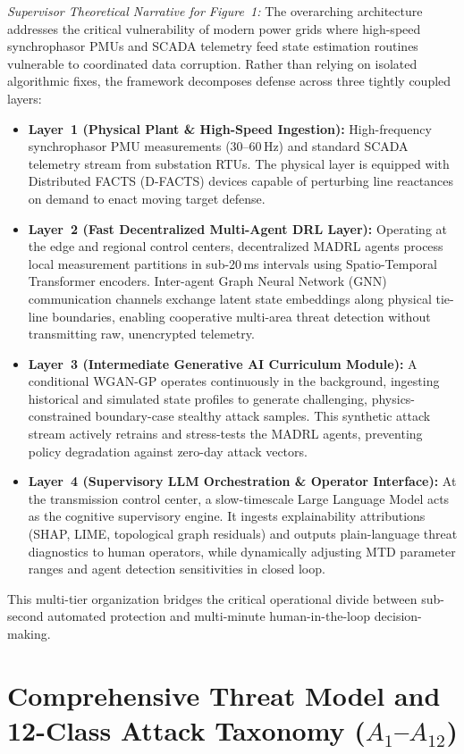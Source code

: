 \documentclass[journal,compsoc]{IEEEtran}
\begin{document}
\textit{Supervisor Theoretical Narrative for Figure~1:}
The overarching architecture addresses the critical vulnerability of modern power grids where high-speed synchrophasor PMUs and SCADA telemetry feed state estimation routines vulnerable to coordinated data corruption. Rather than relying on isolated algorithmic fixes, the framework decomposes defense across three tightly coupled layers:
\begin{itemize}
    \item \textbf{Layer~1 (Physical Plant \& High-Speed Ingestion):} High-frequency synchrophasor PMU measurements (30--60\,Hz) and standard SCADA telemetry stream from substation RTUs. The physical layer is equipped with Distributed FACTS (D-FACTS) devices capable of perturbing line reactances on demand to enact moving target defense.
    \item \textbf{Layer~2 (Fast Decentralized Multi-Agent DRL Layer):} Operating at the edge and regional control centers, decentralized MADRL agents process local measurement partitions in sub-20\,ms intervals using Spatio-Temporal Transformer encoders. Inter-agent Graph Neural Network (GNN) communication channels exchange latent state embeddings along physical tie-line boundaries, enabling cooperative multi-area threat detection without transmitting raw, unencrypted telemetry.
    \item \textbf{Layer~3 (Intermediate Generative AI Curriculum Module):} A conditional WGAN-GP operates continuously in the background, ingesting historical and simulated state profiles to generate challenging, physics-constrained boundary-case stealthy attack samples. This synthetic attack stream actively retrains and stress-tests the MADRL agents, preventing policy degradation against zero-day attack vectors.
    \item \textbf{Layer~4 (Supervisory LLM Orchestration \& Operator Interface):} At the transmission control center, a slow-timescale Large Language Model acts as the cognitive supervisory engine. It ingests explainability attributions (SHAP, LIME, topological graph residuals) and outputs plain-language threat diagnostics to human operators, while dynamically adjusting MTD parameter ranges and agent detection sensitivities in closed loop.
\end{itemize}
This multi-tier organization bridges the critical operational divide between sub-second automated protection and multi-minute human-in-the-loop decision-making.


\section{Comprehensive Threat Model and 12-Class Attack Taxonomy ($A_1$--$A_{12}$)}
\label{sec:threat_taxonomy}
\end{document}
